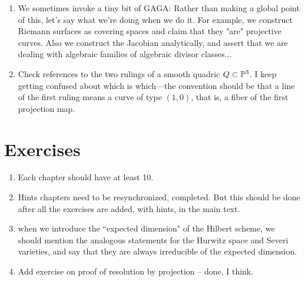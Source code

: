 \documentclass[12pt, leqno]{book}
\begin{document}
\begin{enumerate}
 
 \item We sometimes invoke a tiny bit of GAGA: Rather than making a global point of this, let's say what we're doing when we do it. For example, we construct Riemann surfaces
 as covering spaces and claim that they "are" projective curves. Also we construct the Jacobian analytically, and assert that
 we are dealing with algebraic families of algebraic divisor classes...
   
\item Check references to the two rulings of a smooth quadric $Q \subset {\mathbb P}^3$. I keep getting confused about which is which---the convention should be that a line of the first ruling means a curve of type $(1,0)$, that is, a fiber of the first projection map.


\end{enumerate}
\section{Exercises}

\begin{enumerate}
\item Each chapter should have at least 10. 
\item Hints chapters need to be resynchronized, completed. But this should be done after all the exercises are added, with
hints, in the main text.

 \item when we introduce the ``expected dimension" of the Hilbert scheme, we should mention the analogous statements for the Hurwitz space and Severi varieties, and say that they are always irreducible of the expected dimension.


\item Add exercise on proof of resolution by projection -- done, I think.

\end{enumerate}
\end{document}
